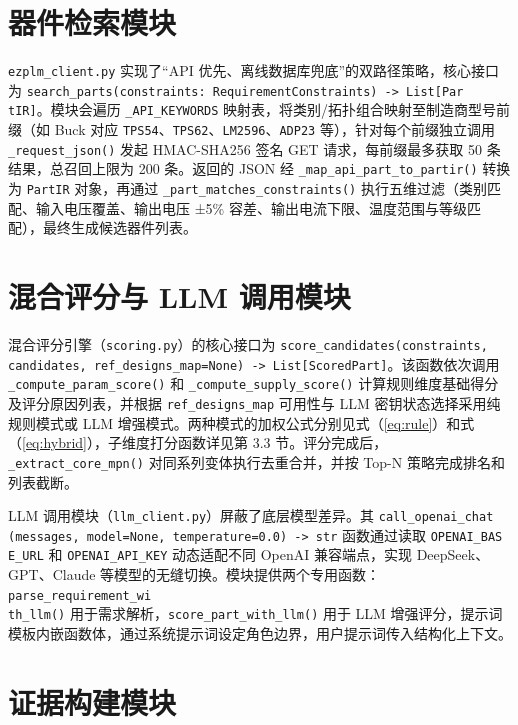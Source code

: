 \section{器件检索模块}

\texttt{ezplm\_client.py} 实现了“API 优先、离线数据库兜底”的双路径策略，核心接口为 \texttt{search\_parts(constraints: RequirementConstraints) -> List[Par\\tIR]}。模块会遍历 \texttt{\_API\_KEYWORDS} 映射表，将类别/拓扑组合映射至制造商型号前缀（如 Buck 对应 \texttt{TPS54}、\texttt{TPS62}、\texttt{LM2596}、\texttt{ADP23} 等），针对每个前缀独立调用 \texttt{\_request\_json()} 发起 HMAC-SHA256 签名 GET 请求，每前缀最多获取 50 条结果，总召回上限为 200 条。返回的 JSON 经 \texttt{\_map\_api\_part\_to\_partir()} 转换为 \texttt{PartIR} 对象，再通过 \texttt{\_part\_matches\_constraints()} 执行五维过滤（类别匹配、输入电压覆盖、输出电压 ±5\% 容差、输出电流下限、温度范围与等级匹配），最终生成候选器件列表。

\section{混合评分与 LLM 调用模块}

混合评分引擎（\texttt{scoring.py}）的核心接口为 
\texttt{score\_candidates(constraints, candidates, ref\_designs\_map=None) -> List[ScoredPart]}。该函数依次调用 \texttt{\_compute\_param\_score()} 和 \texttt{\_compute\_supply\_score()} 计算规则维度基础得分及评分原因列表，并根据 \texttt{ref\_designs\_map} 可用性与 LLM 密钥状态选择采用纯规则模式或 LLM 增强模式。两种模式的加权公式分别见式（\ref{eq:rule}）和式（\ref{eq:hybrid}），子维度打分函数详见第 3.3 节。评分完成后，\texttt{\_extract\_core\_mpn()} 对同系列变体执行去重合并，并按 Top-N 策略完成排名和列表截断。

LLM 调用模块（\texttt{llm\_client.py}）屏蔽了底层模型差异。其 \texttt{call\_openai\_chat\\(messages, model=None, temperature=0.0) -> str} 函数通过读取 \texttt{OPENAI\_BAS\\E\_URL} 和 \texttt{OPENAI\_API\_KEY} 动态适配不同 OpenAI 兼容端点，实现 DeepSeek、GPT、Claude 等模型的无缝切换。模块提供两个专用函数：\texttt{parse\_requirement\_wi\\th\_llm()} 用于需求解析，\texttt{score\_part\_with\_llm()} 用于 LLM 增强评分，提示词模板内嵌函数体，通过系统提示词设定角色边界，用户提示词传入结构化上下文。

\section{证据构建模块}

